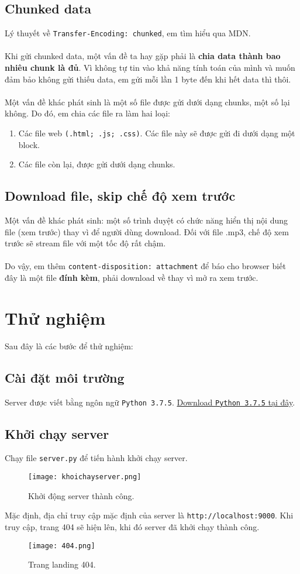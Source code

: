 \documentclass[]{article}
\begin{document}
\subsection{Chunked data}
Lý thuyết về \texttt{Transfer-Encoding: chunked}, em tìm hiểu qua MDN\cite{chunked}.
\\\\
Khi gửi chunked data, một vấn đề ta hay gặp phải là \textbf{chia data thành bao nhiêu chunk là đủ}. Vì không tự tin vào khả năng tính toán của mình và muốn đảm bảo không gửi thiếu data, em gửi mỗi lần 1 byte đến khi hết data thì thôi.
\\\\
Một vấn đề khác phát sinh là một số file được gửi dưới dạng chunks, một số lại không. Do đó, em chia các file ra làm hai loại:
\begin{enumerate}
\item Các file web \texttt{(.html; .js; .css)}. Các file này sẽ được gửi đi dưới dạng một block.
\item Các file còn lại, được gửi dưới dạng chunks.
\end{enumerate}

\subsection{Download file, skip chế độ xem trước}
Một vấn đề khác phát sinh: một số trình duyệt có chức năng hiển thị nội dung file (xem trước) thay vì để người dùng download. Đối với file .mp3, chế độ xem trước sẽ stream file với một tốc độ rất chậm.
\\\\
Do vậy, em thêm \texttt{content-disposition: attachment} để báo cho browser biết đây là một file \textbf{đính kèm}, phải download về thay vì mở ra xem trước.

\section{Thử nghiệm}
Sau đây là các bước để thử nghiệm:

\subsection{Cài đặt môi trường}
Server được viết bằng ngôn ngữ \texttt{Python 3.7.5}. \href{https://www.python.org/downloads/release/python-375/}{Download \texttt{Python 3.7.5} tại đây}.

\subsection{Khởi chạy server}
Chạy file \texttt{server.py} để tiến hành khởi chạy server.
\begin{figure}[H]
\centering
\texttt{[image: khoichayserver.png]}
\caption{Khởi động server thành công.}
\end{figure}
Mặc định, địa chỉ truy cập mặc định của server là \texttt{http://localhost:9000}. Khi truy cập, trang 404 sẽ hiện lên, khi đó server đã khởi chạy thành công.
\begin{figure}[H]
\centering
\texttt{[image: 404.png]}
\caption{Trang landing 404.}
\end{figure}
\end{document}
